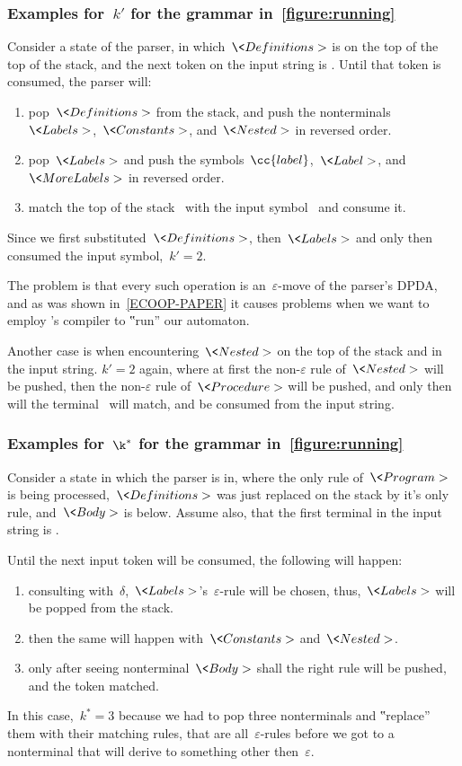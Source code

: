 \subsubsection{Examples for~$k'$ for the grammar in~\cref{figure:running}}
Consider a state of the parser, in which~$\<Definitions>$ is on
  the top of the top of the stack, and the next token on the input string
  is .
Until that token is consumed, the parser will:
  \begin{enumerate}
    \item pop~$\<Definitions>$ from the stack, and push the
      nonterminals~$\<Labels>$,~$\<Constants>$, and~$\<Nested>$
      in reversed order.
    \item pop~$\<Labels>$ and push the
      symbols~$\cc{label}$,~$\<Label>$, and
$\<MoreLabels>$ in reversed order.
    \item match the top of the stack~ with the input symbol~
      and consume it.
  \end{enumerate}
Since we first substituted~$\<Definitions>$, then~$\<Labels>$
  and only then consumed the input symbol,~$k'=2$.

The problem is that every such operation is
  an~$ε$-move of the parser's DPDA, and as was shown in~\cref{ECOOP-PAPER}
  it causes problems when we want to employ \Java's compiler to ‟run” our
  automaton.

Another case is when encountering~$\<Nested>$ on the top of the stack
  and  in the input string.
$k'=2$ again, where at first the non-$ε$ rule of~$\<Nested>$ will
  be pushed, then the non-$ε$ rule of~$\<Procedure>$ will be
  pushed, and only then will the terminal~ will match,
  and be consumed from the input string.

\subsubsection{Examples for~$\k^*$ for the grammar in~\cref{figure:running}}
Consider a state in which the parser is in, where the
  only rule of~$\<Program>$ is being processed,~$\<Definitions>$
  was just replaced on the stack by it's only rule, and~$\<Body>$ is below.
Assume also, that the first terminal in the input string is .

Until the next input token will be consumed, the following will happen:
  \begin{enumerate}
    \item consulting with~$δ$,~$\<Labels>$'s~$ε$-rule will
      be chosen, thus,~$\<Labels>$ will be popped from the stack.
    \item then the same will happen with~$\<Constants>$ and~$\<Nested>$.
    \item only after seeing nonterminal~$\<Body>$ shall the right rule will be
      pushed, and the token matched.
  \end{enumerate}
In this case,~$k^*=3$ because we had to pop three nonterminals and ‟replace” them with
  their matching rules, that are all~$ε$-rules before we got to a nonterminal
  that will derive to something other then~$ε$.

